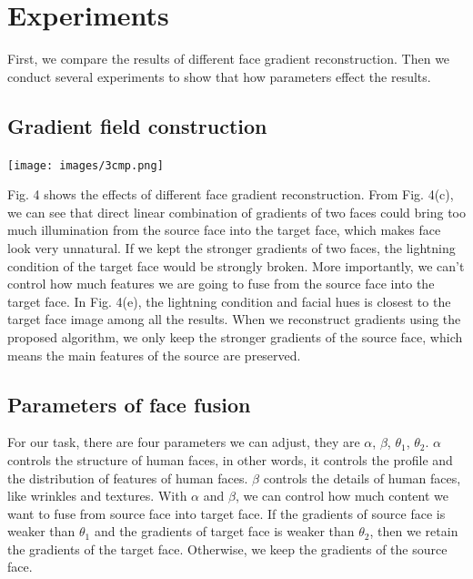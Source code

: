 \section{Experiments}


First, we compare the results of different face gradient reconstruction. 
Then we conduct several experiments to show that how parameters effect the results.


\subsection{Gradient field construction}
\begin{center}
    \texttt{[image: images/3cmp.png]}
\end{center}

Fig. 4 shows the effects of different face gradient reconstruction. From Fig. 4(c), we can see that direct linear combination of  gradients of two faces could bring too much illumination from the source face into the target face, which makes face look very unnatural. 
%
If we kept the stronger gradients of two faces, the lightning condition of the target face would be strongly broken. 
%
More importantly, we can't control how much features we are going to fuse from the source face into the target face. 
In Fig. 4(e), the lightning condition and facial hues is closest to the target face image among all the results. 
%
When we reconstruct gradients using the proposed algorithm, we only keep the stronger gradients of the source face, which means the main features of the source are preserved.

\subsection{Parameters of face fusion}

 For our task, there are four parameters we can adjust, they are $\alpha$, $\beta$, $\theta_1$, $\theta_2$. $\alpha$ controls the structure of human faces, in other words, it controls the profile and the distribution of features of human faces. 
 $\beta$ controls the details of human faces, like wrinkles and textures. 
 With $\alpha$ and $\beta$, we can control how much content we want to fuse from source face into target face. 
 If the gradients of source face is weaker than $\theta_1$ and the gradients of target face is weaker than $\theta_2$, then we retain the gradients of the target face. 
 Otherwise, we keep the gradients of the source face.

